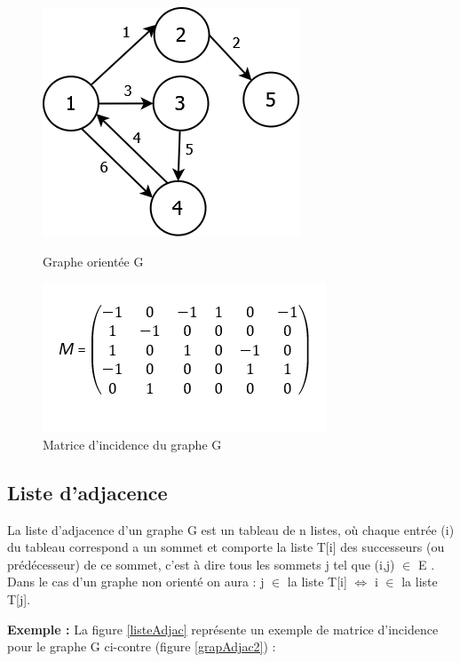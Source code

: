 \begin{figure}[!h]
	\begin{minipage}[c]{.46\linewidth}
	\begin{center}
		\includegraphics[height=100 pt, width=110 pt]{./ressources/image/graphIncid.png} 
		\caption{Graphe orientée G}
		\label{grapIncid}
	\end{center}
	\end{minipage} 
	\begin{minipage}[c]{.46\linewidth}
	\begin{center}
		\includegraphics[height=110 pt, width=140 pt]{./ressources/image/matriceIncid.png} 
		\caption{Matrice d'incidence du graphe G}
		\label{matriceIncid}
	\end{center}
	\end{minipage} 
\end{figure}

		
		
		\subsection{Liste d'adjacence}
			La liste d'adjacence d'un graphe G est un tableau de n listes, où chaque entrée (i) du tableau correspond a un sommet et comporte la liste T[i] des successeurs (ou prédécesseur) de ce sommet, c'est à dire tous les sommets j tel que (i,j) $\in$ E .\\
Dans le cas d'un graphe non orienté on aura : j $\in$ la liste T[i]  $\iff$ i $\in$ la liste T[j].

\textbf{Exemple :} La figure \ref{listeAdjac} représente 					un exemple de matrice d'incidence pour le graphe G ci-contre 			(figure \ref{grapAdjac2}) :
			
